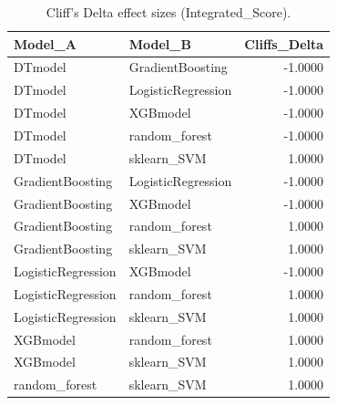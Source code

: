 \begin{table}[t]
\centering
\begin{tabular}{llr}
\toprule
Model_A & Model_B & Cliffs_Delta \\
\midrule
DTmodel & GradientBoosting & -1.0000 \\
DTmodel & LogisticRegression & -1.0000 \\
DTmodel & XGBmodel & -1.0000 \\
DTmodel & random_forest & -1.0000 \\
DTmodel & sklearn_SVM & 1.0000 \\
GradientBoosting & LogisticRegression & -1.0000 \\
GradientBoosting & XGBmodel & -1.0000 \\
GradientBoosting & random_forest & 1.0000 \\
GradientBoosting & sklearn_SVM & 1.0000 \\
LogisticRegression & XGBmodel & -1.0000 \\
LogisticRegression & random_forest & 1.0000 \\
LogisticRegression & sklearn_SVM & 1.0000 \\
XGBmodel & random_forest & 1.0000 \\
XGBmodel & sklearn_SVM & 1.0000 \\
random_forest & sklearn_SVM & 1.0000 \\
\bottomrule
\end{tabular}
\caption{Cliff's Delta effect sizes (Integrated_Score).}
\label{tab:cliffs_Integrated_Score}
\end{table}